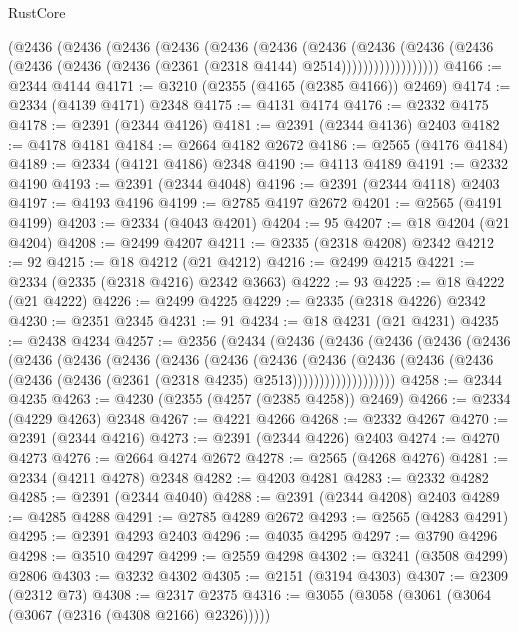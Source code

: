 \begin{lexlean}{RustCore}
\begin{coremodule}
            (@2436
              (@2436
                (@2436
                  (@2436
                    (@2436
                      (@2436
                        (@2436
                          (@2436
                            (@2436
                              (@2436
                                (@2436 (@2436 (@2436 (@2361 (@2318 @4144) @2514))))))))))))))))))
@4166 := @2344 @4144
@4171 := @3210 (@2355 (@4165 (@2385 @4166)) @2469)
@4174 := @2334 (@4139 @4171) @2348
@4175 := @4131 @4174
@4176 := @2332 @4175
@4178 := @2391 (@2344 @4126)
@4181 := @2391 (@2344 @4136) @2403
@4182 := @4178 @4181
@4184 := @2664 @4182 @2672
@4186 := @2565 (@4176 @4184)
@4189 := @2334 (@4121 @4186) @2348
@4190 := @4113 @4189
@4191 := @2332 @4190
@4193 := @2391 (@2344 @4048)
@4196 := @2391 (@2344 @4118) @2403
@4197 := @4193 @4196
@4199 := @2785 @4197 @2672
@4201 := @2565 (@4191 @4199)
@4203 := @2334 (@4043 @4201)
@4204 := 95
@4207 := @18 @4204 (@21 @4204)
@4208 := @2499 @4207
@4211 := @2335 (@2318 @4208) @2342
@4212 := 92
@4215 := @18 @4212 (@21 @4212)
@4216 := @2499 @4215
@4221 := @2334 (@2335 (@2318 @4216) @2342 @3663)
@4222 := 93
@4225 := @18 @4222 (@21 @4222)
@4226 := @2499 @4225
@4229 := @2335 (@2318 @4226) @2342
@4230 := @2351 @2345
@4231 := 91
@4234 := @18 @4231 (@21 @4231)
@4235 := @2438 @4234
@4257 := @2356
    (@2434
      (@2436
        (@2436
          (@2436
            (@2436
              (@2436
                (@2436
                  (@2436
                    (@2436
                      (@2436
                        (@2436
                          (@2436
                            (@2436
                              (@2436
                                (@2436
                                  (@2436 (@2436 (@2436 (@2361 (@2318 @4235) @2513)))))))))))))))))))
@4258 := @2344 @4235
@4263 := @4230 (@2355 (@4257 (@2385 @4258)) @2469)
@4266 := @2334 (@4229 @4263) @2348
@4267 := @4221 @4266
@4268 := @2332 @4267
@4270 := @2391 (@2344 @4216)
@4273 := @2391 (@2344 @4226) @2403
@4274 := @4270 @4273
@4276 := @2664 @4274 @2672
@4278 := @2565 (@4268 @4276)
@4281 := @2334 (@4211 @4278) @2348
@4282 := @4203 @4281
@4283 := @2332 @4282
@4285 := @2391 (@2344 @4040)
@4288 := @2391 (@2344 @4208) @2403
@4289 := @4285 @4288
@4291 := @2785 @4289 @2672
@4293 := @2565 (@4283 @4291)
@4295 := @2391 @4293 @2403
@4296 := @4035 @4295
@4297 := @3790 @4296
@4298 := @3510 @4297
@4299 := @2559 @4298
@4302 := @3241 (@3508 @4299) @2806
@4303 := @3232 @4302
@4305 := @2151 (@3194 @4303)
@4307 := @2309 (@2312 @73)
@4308 := @2317 @2375
@4316 := @3055 (@3058 (@3061 (@3064 (@3067 (@2316 (@4308 @2166) @2326)))))

\end{coremodule}
\end{lexlean}
